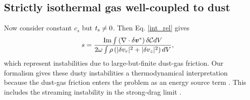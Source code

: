 \subsection{Strictly isothermal gas well-coupled to dust} 
Now consider constant $c_s$ but $t_\mathrm{s}\neq0$. Then Eq. \ref{int_rel}
gives 
\begin{align}
  s = \frac{\operatorname{Im}\int \left(\nabla\cdot\delta\bm{v}^*\right)\delta\mathcal{C}dV}{2\omega\int\rho\left(|\delta
    v_r|^2 + |\delta v_z|^2\right)dV}, 
\end{align}
which represent instabilities due to large-but-finite dust-gas
friction. Our formalism gives these dusty instabilities a 
thermodynamical interpretation because the dust-gas friction enters the problem
as an energy source term \citep[cf. thermal instabilities in
  stars, see also][]{latter06}. 
This includes the streaming instability in
the strong-drag limit \citep{youdin05a, jacquet11, laibe14}. 
